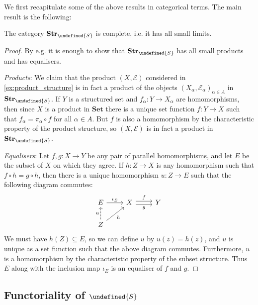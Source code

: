 \documentclass[article, a4paper, 11pt, oneside]{memoir}
\let\mathfrak\undefined
\numberwithin{equation}{chapter}
\newcommand{\calE}{\mathcal{E}}
\newcommand{\strucS}{\mathfrak{S}}
\newcommand{\ncat}[1]{\mathbf{#1}} %
\newcommand{\catSet}{\ncat{Set}} %
\newcommand{\catStruc}[1]{\ncat{Str}_{#1}} %
\newcommand{\catStrucS}{\catStruc{\strucS}} %
\begin{document}
We first recapitulate some of the above results in categorical terms. The main result is the following:

\begin{theorem}[Completeness of $\catStrucS$]
    The category $\catStrucS$ is complete, i.e. it has all small limits.
\end{theorem}

\begin{proof}
    By e.g. \textcite[Theorem~60]{smithcategory} it is enough to show that $\catStrucS$ has all small products and has equalisers.

    \emph{Products}: We claim that the product $(X, \calE)$ considered in \cref{ex:product_structure} is in fact a product of the objects $(X_\alpha, \calE_\alpha)_{\alpha \in A}$ in $\catStrucS$. If $Y$ is a structured set and $f_\alpha \colon Y \to X_\alpha$ are homomorphisms, then since $X$ is a product in $\catSet$ there is a unique set function $f \colon Y \to X$ such that $f_\alpha = \pi_\alpha \circ f$ for all $\alpha \in A$. But $f$ is also a homomorphism by the characteristic property of the product structure, so $(X, \calE)$ is in fact a product in $\catStrucS$.

    \emph{Equalisers}: Let $f,g \colon X \to Y$ be any pair of parallel homomorphisms, and let $E$ be the subset of $X$ on which they agree. If $h \colon Z \to X$ is any homomorphism such that $f \circ h = g \circ h$, then there is a unique homomorphism $u \colon Z \to E$ such that the following diagram commutes:
    \begin{equation*}
        \begin{tikzcd}
            E
                \ar[r, "\iota_E"]
            & X
                \ar[r, shift left, "f"]
                \ar[r, shift right, "g", swap]
            & Y \\
            Z
                \ar[u, dashed, "u"]
                \ar[ur, "h", swap]
        \end{tikzcd}
    \end{equation*}
    We must have $h(Z) \subseteq E$, so we can define $u$ by $u(z) = h(z)$, and $u$ is unique as a set function such that the above diagram commutes. Furthermore, $u$ is a homomorphism by the characteristic property of the subset structure. Thus $E$ along with the inclusion map $\iota_E$ is an equaliser of $f$ and $g$.
\end{proof}


\subsection{Functoriality of $\strucS$}
\end{document}
